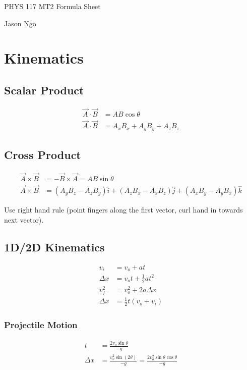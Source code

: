 \documentclass[letterpaper]{article}
\begin{document}
PHYS 117 MT2 Formula Sheet

Jason Ngo

\section{Kinematics}
\subsection{Scalar Product}
\begin{align*}
    \vec{A} \cdot \vec{B} &= AB \cos \theta \\
    \vec{A} \cdot \vec{B} &= A_x B_x + A_y B_y + A_z B_z
\end{align*}

\subsection{Cross Product}
\begin{align*}
    \vec{A} \times \vec{B} &= - \vec{B} \times \vec{A} = AB \sin \theta \\
    \vec{A} \times \vec{B} &= \left( A_y B_z - A_z B_y \right) \hat{i}
                            + \left( A_z B_x - A_x B_z \right) \hat{j}
                            + \left( A_x B_y - A_y B_x \right) \hat{k}
\end{align*}

Use right hand rule (point fingers along the first vector, curl hand in towards next vector).

\subsection{1D/2D Kinematics}
\begin{align*}
    v_i &= v_o + at \\
    \Delta x &= v_o t + \tfrac{1}{2} at^2 \\
    v_f^2 &= v_o^2 + 2 a \Delta x \\
    \Delta x &= \tfrac{1}{2} t \left( v_o + v_i \right)
\end{align*}

\subsubsection{Projectile Motion}
\begin{align*}
    t &= \frac{2 v_o \sin \theta}{-g} \\
    \Delta x &= \frac{v_o^2 \sin \left( 2 \theta \right)}{-g}
              = \frac{2 v_o^2 \sin \theta \cos \theta}{-g} \\
\end{align*}
\end{document}
